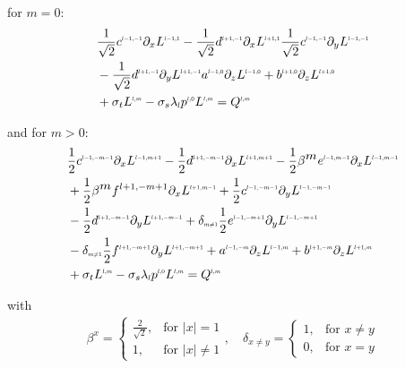 for $m=0$:
\begin{align*}
&
\frac{1}{\sqrt{2}}c^{\scaleto{l-1,-1}{4pt}}\partial_x L^{\scaleto{l-1,1}{4pt}}
-\frac{1}{\sqrt{2}}d^{\scaleto{l+1,-1}{4pt}}\partial_x L^{\scaleto{l+1,1}{4pt}}
\frac{1}{\sqrt{2}}c^{\scaleto{l-1,-1}{4pt}}\partial_y L^{\scaleto{l-1,-1}{4pt}}
\\&
-\frac{1}{\sqrt{2}}d^{\scaleto{l+1,-1}{4pt}}\partial_y L^{\scaleto{l+1,-1}{4pt}}
a^{\scaleto{l-1,0}{4pt}}\partial_z L^{\scaleto{l-1,0}{4pt}}
+b^{\scaleto{l+1,0}{4pt}}\partial_z L^{\scaleto{l+1,0}{4pt}}
\\&
+\sigma_t L^{\scaleto{l,m}{4pt}}
-\sigma_s\lambda_{\scaleto{l}{4pt}}p^{\scaleto{l,0}{4pt}}L^{\scaleto{l,m}{4pt}}
= Q^{\scaleto{l,m}{4pt}}
\end{align*}

and for $m>0$:
\begin{align}
&
\frac{1}{2}c^{\scaleto{l-1,-m-1}{4pt}}\partial_x L^{\scaleto{l-1,m+1}{4pt}}
-\frac{1}{2}d^{\scaleto{l+1,-m-1}{4pt}}\partial_x L^{\scaleto{l+1,m+1}{4pt}}
-\frac{1}{2}\beta^{\scaleto{m}{4pt}}e^{\scaleto{l-1,m-1}{4pt}}\partial_x L^{\scaleto{l-1,m-1}{4pt}}
\nonumber
\\&
+\frac{1}{2}\beta^{\scaleto{m}{4pt}}f^{l+1,-m+1}\partial_x L^{\scaleto{l+1,m-1}{4pt}}
+\frac{1}{2}c^{\scaleto{l-1,-m-1}{4pt}}\partial_y L^{\scaleto{l-1,-m-1}{4pt}}
\nonumber
\\&
-\frac{1}{2}d^{\scaleto{l+1,-m-1}{4pt}}\partial_y L^{\scaleto{l+1,-m-1}{4pt}}
+\delta_{\scaleto{m\neq 1}{4pt}}\frac{1}{2}e^{\scaleto{l-1,-m+1}{4pt}}\partial_y L^{\scaleto{l-1,-m+1}{4pt}}
\nonumber
\\&
-\delta_{\scaleto{m\neq 1}{4pt}}\frac{1}{2}f^{\scaleto{l+1,-m+1}{4pt}}\partial_y L^{\scaleto{l+1,-m+1}{4pt}}
+a^{\scaleto{l-1,-m}{4pt}}\partial_z L^{\scaleto{l-1,m}{4pt}}
+b^{\scaleto{l+1,-m}{4pt}}\partial_z L^{\scaleto{l+1,m}{4pt}}
\nonumber
\\&
+\sigma_t L^{\scaleto{l,m}{4pt}}
-\sigma_s\lambda_{\scaleto{l}{4pt}}p^{\scaleto{l,0}{4pt}}L^{\scaleto{l,m}{4pt}}
= Q^{\scaleto{l,m}{4pt}}
\nonumber
\end{align}

with
\begin{align*}
\label{eq:real_sh_basis}
\beta^{x}=
\left\{
\begin{array}{lr}
\frac{2}{\sqrt{2}}, & \text{for } \vert x\vert = 1\\
1, & \text{for } \vert x\vert \neq 1
\end{array}
\right.
,\quad
\delta_{x\neq y}=
\left\{
\begin{array}{lr}
1, & \text{for } x \neq y \\
0, & \text{for } x = y
\end{array}
\right.
\end{align*}


